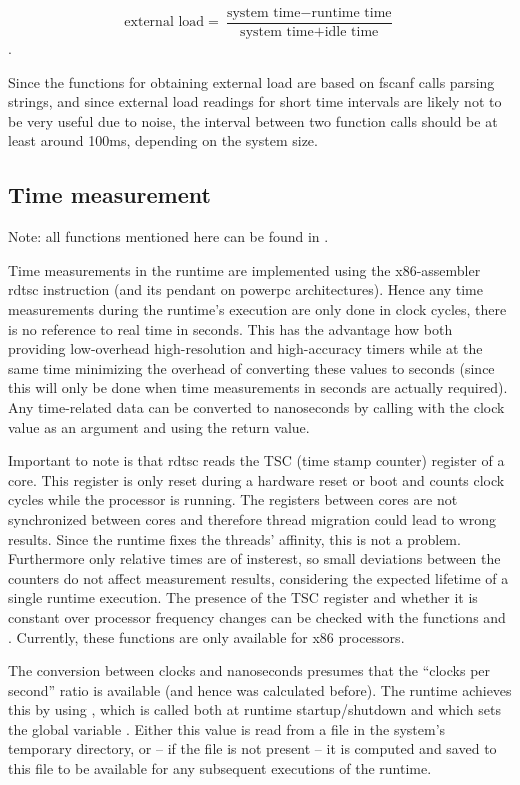 \[ \text{external load} = \frac{\text{system time} - \text{runtime
time}}{\text{system time} + \text{idle time}} \].

Since the functions for obtaining external load are based on fscanf calls
parsing strings, and since external load readings for short time intervals are
likely not to be very useful due to noise, the interval between two
 function calls should be at least around
100ms, depending on the system size.

\subsection{Time measurement} 
\label{sec:runtime.time.measurement}

Note: all functions mentioned here can be found in .


Time measurements in the runtime are implemented using the x86-assembler rdtsc
instruction (and its pendant on powerpc architectures). Hence any time
measurements during the runtime's execution are only done in clock cycles, there
is no reference to real time in seconds. This has the advantage how both
providing low-overhead high-resolution and high-accuracy timers while at the
same time minimizing the overhead of converting these values to seconds (since
this will only be done when time measurements in seconds are actually required).
Any time-related data can be converted to nanoseconds by calling
 with the clock value as an
argument and using the return value.

Important to note is that rdtsc reads the TSC (time stamp counter) register of a
core. This register is only reset during a hardware reset or boot and counts
clock cycles while the processor is running. The registers between cores are not
synchronized between cores and therefore thread migration could lead to wrong
results. Since the runtime fixes the threads' affinity, this is not a problem.
Furthermore only relative times are of insterest, so small deviations between
the counters do not affect measurement results, considering the expected
lifetime of a single runtime execution. The presence of the TSC register and
whether it is constant over processor frequency changes can be checked with the
functions  and
. Currently, these functions are only
available for x86 processors.

The conversion between clocks and nanoseconds presumes that the ``clocks per
second'' ratio is available (and hence was calculated before). The runtime
achieves this by using ,
which is called both at runtime startup/shutdown and which sets the global
variable . Either this value is read from a
file  in the system's temporary directory,
or -- if the file is not present -- it is computed and saved to this file to be
available for any subsequent executions of the runtime. 

